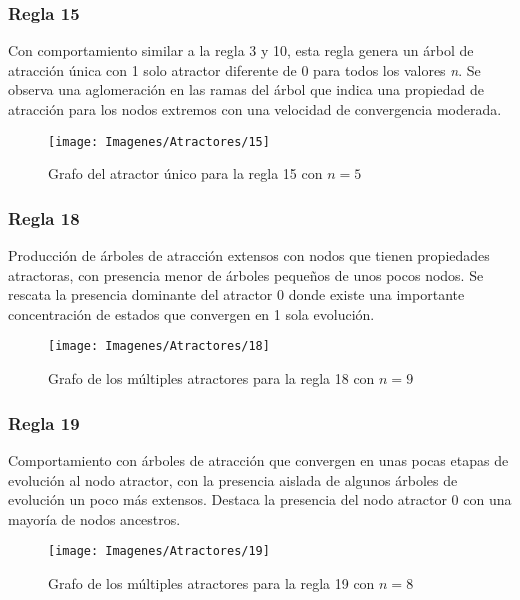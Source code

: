\documentclass[]{article}
\begin{document}
			
			\newpage
			\subsubsection{Regla 15}
				\justifying
				Con comportamiento similar a la regla 3 y 10, esta regla genera un árbol de atracción única con 1 solo atractor diferente de 0 para todos los valores \textit{n}. Se observa una aglomeración en las ramas del árbol que indica una propiedad de atracción para los nodos extremos con una velocidad de convergencia moderada.
				
				\hfill\break
				\hfill\break
				\hfill\break
				\begin{figure}[!h]
					\centering
					\texttt{[image: Imagenes/Atractores/15]}
					\caption{Grafo del atractor único para la regla 15 con $n=5$}
					\label{Regla_15}
				\end{figure}
				
				
			\newpage
			\subsubsection{Regla 18}
				\justifying
				Producción de árboles de atracción extensos con nodos que tienen propiedades atractoras, con presencia menor de árboles pequeños de unos pocos nodos. Se rescata la presencia dominante del atractor 0 donde existe una importante concentración de  estados que convergen en 1 sola evolución.
				
				\hfill\break
				\hfill\break
				\hfill\break
				\begin{figure}[!h]
					\centering
					\texttt{[image: Imagenes/Atractores/18]}
					\caption{Grafo de los múltiples atractores para la regla 18 con $n=9$}
					\label{Regla_18}
				\end{figure}
				
			
			\newpage
			\subsubsection{Regla 19}
				\justifying
				Comportamiento con árboles de atracción que convergen en unas pocas  etapas de evolución al nodo atractor, con la presencia aislada de algunos árboles de evolución un poco más extensos. Destaca la presencia del nodo atractor 0 con una mayoría de nodos ancestros.
				
				\hfill\break
				\hfill\break
				\hfill\break
				\begin{figure}[!h]
					\centering
					\texttt{[image: Imagenes/Atractores/19]}
					\caption{Grafo de los múltiples atractores para la regla 19 con $n=8$}
					\label{Regla_19}
				\end{figure}
			
\end{document}
